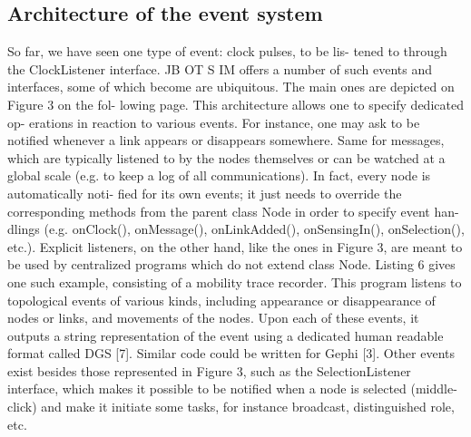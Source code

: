 \subsection{Architecture of the event system}
So far, we have seen one type of event: clock pulses, to be lis-
tened to through the ClockListener interface. JB OT S IM offers
a number of such events and interfaces, some of which become are
ubiquitous. The main ones are depicted on Figure 3 on the fol-
lowing page. This architecture allows one to specify dedicated op-
erations in reaction to various events. For instance, one may ask
to be notified whenever a link appears or disappears somewhere.
Same for messages, which are typically listened to by the nodes
themselves or can be watched at a global scale (e.g. to keep a log
of all communications). In fact, every node is automatically noti-
fied for its own events; it just needs to override the corresponding
methods from the parent class Node in order to specify event han-
dlings (e.g. onClock(), onMessage(), onLinkAdded(),
onSensingIn(), onSelection(), etc.). Explicit listeners,
on the other hand, like the ones in Figure 3, are meant to be used
by centralized programs which do not extend class Node.
Listing 6 gives one such example, consisting of a mobility trace
recorder. This program listens to topological events of various
kinds, including appearance or disappearance of nodes or links, and
movements of the nodes. Upon each of these events, it outputs a
string representation of the event using a dedicated human readable
format called DGS [7]. Similar code could be written for Gephi [3].
Other events exist besides those represented in Figure 3, such
as the SelectionListener interface, which makes it possible
to be notified when a node is selected (middle-click) and make it
initiate some tasks, for instance broadcast, distinguished role, etc.
